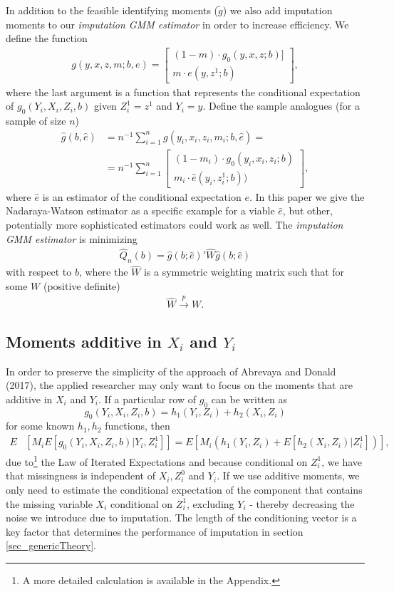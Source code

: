 \documentclass{article}
\theoremstyle{definition}
\theoremstyle{remark}
\begin{document}
In addition to the feasible identifying moments ($\tilde{g}$) we also add imputation moments to our \emph{imputation GMM estimator} in order to increase efficiency. We define the function
\begin{align}
g(y,x,z,m;b,e)= \left[\begin{array}{c}
(1-m) \cdot g_0(y,x,z;b)]\\
m \cdot e(y, z^1; b)
\end{array}\right],
\end{align}
where the last argument is a function that represents the conditional expectation of $g_0(Y_i, X_i, Z_i, b)$ given $Z^1_i=z^1$ and $Y_i=y$. Define the sample analogues (for a sample of size $n$)
\begin{align}
\hat{g}(b, \hat{e})&=n^{-1}\sum_{i=1}^n g(y_i,x_i,z_i,m_i; b , \hat{e})= \\
&=n^{-1}\sum_{i=1}^n\left[\begin{array}{c}
(1-m_i) \cdot g_0(y_i,x_i,z_i; b)  \\
m_i \cdot \hat{e}(y_i, z_i^1; b))
\end{array}\right], \nonumber
\end{align}
where $\hat{e}$ is an estimator of the conditional expectation $e$. In this paper we give the Nadaraya-Watson estimator as a specific example for a viable $\hat{e}$, but other, potentially more sophisticated estimators could work as well. The \textit{imputation GMM estimator} is minimizing
\begin{align}
\hat{Q}_n(b)= \hat{g}(b;\hat{e})'\hat{W}\hat{g}(b;\hat{e})
\end{align}
with respect to $b$, where the $\hat{W}$ is a symmetric weighting matrix such that for some $W$ (positive definite)
\begin{align}
\hat{W} \stackrel{p}{\rightarrow}W.
\end{align}


\subsection{Moments additive in $X_i$ and $Y_i$}
In order to preserve the simplicity of the approach of Abrevaya and Donald (2017), the applied researcher may only want to focus on the moments that are additive in $X_i$ and $Y_i$. If a particular row of $g_0$ can be written as
\[g_0(Y_i,X_i,Z_i,b) = h_1(Y_i,Z_i) + h_2(X_i,Z_i)
\]
for some known $h_1,h_2$ functions, then
\begin{align}
E&[M_i E[g_0(Y_i,X_i,Z_i,b)|Y_i,Z_i^1]]= E\left[M_i (h_1(Y_i,Z_i) + E[h_2(X_i,Z_i)|Z^1_i])\right],
\end{align}
due to\footnote{A more detailed calculation is available in the Appendix.} the Law of Iterated Expectations and because conditional on $Z_i^1$, we have that missingness is independent of $X_i,Z_i^0$ and $Y_i$. If we use additive moments, we only need to estimate the conditional expectation of the component that contains the missing variable $X_i$ conditional on $Z_i^1$, excluding $Y_i$ - thereby decreasing the noise we introduce due to imputation. The length of the conditioning vector is a key factor that determines the performance of imputation in section \ref{sec_genericTheory}.
\end{document}
